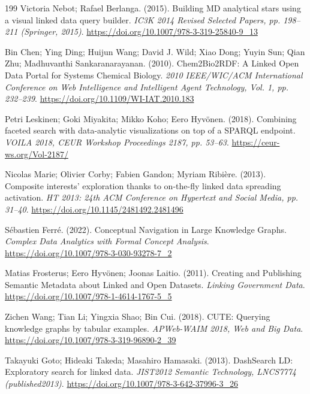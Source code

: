 \documentclass[manuscript,review,screen]{acmart}
\begin{document}
\begin{thebibliography}{199}
 Victoria Nebot; Rafael Berlanga. (2015). Building MD analytical stars using a visual linked data query builder. \textit{IC3K 2014 Revised Selected Papers, pp. 198--211 (Springer, 2015)}. \url{https://doi.org/10.1007/978-3-319-25840-9_13}

 Bin Chen; Ying Ding; Huijun Wang; David J. Wild; Xiao Dong; Yuyin Sun; Qian Zhu; Madhuvanthi Sankaranarayanan. (2010). Chem2Bio2RDF: A Linked Open Data Portal for Systems Chemical Biology. \textit{2010 IEEE/WIC/ACM International Conference on Web Intelligence and Intelligent Agent Technology, Vol. 1, pp. 232--239}. \url{https://doi.org/10.1109/WI-IAT.2010.183}

 Petri Leskinen; Goki Miyakita; Mikko Koho; Eero Hyv\"{o}nen. (2018). Combining faceted search with data-analytic visualizations on top of a SPARQL endpoint. \textit{VOILA 2018, CEUR Workshop Proceedings 2187, pp. 53--63}. \url{https://ceur-ws.org/Vol-2187/}

 Nicolas Marie; Olivier Corby; Fabien Gandon; Myriam Ribi\`{e}re. (2013). Composite interests' exploration thanks to on-the-fly linked data spreading activation. \textit{HT 2013: 24th ACM Conference on Hypertext and Social Media, pp. 31--40}. \url{https://doi.org/10.1145/2481492.2481496}

 S\'{e}bastien Ferr\'{e}. (2022). Conceptual Navigation in Large Knowledge Graphs. \textit{Complex Data Analytics with Formal Concept Analysis}. \url{https://doi.org/10.1007/978-3-030-93278-7_2}

 Matias Frosterus; Eero Hyv\"{o}nen; Joonas Laitio. (2011). Creating and Publishing Semantic Metadata about Linked and Open Datasets. \textit{Linking Government Data}. \url{https://doi.org/10.1007/978-1-4614-1767-5_5}

 Zichen Wang; Tian Li; Yingxia Shao; Bin Cui. (2018). CUTE: Querying knowledge graphs by tabular examples. \textit{APWeb-WAIM 2018, Web and Big Data}. \url{https://doi.org/10.1007/978-3-319-96890-2_39}

 Takayuki Goto; Hideaki Takeda; Masahiro Hamasaki. (2013). DashSearch LD: Exploratory search for linked data. \textit{JIST2012 Semantic Technology, LNCS7774 (published2013)}. \url{https://doi.org/10.1007/978-3-642-37996-3_26}


\end{thebibliography}
\end{document}
